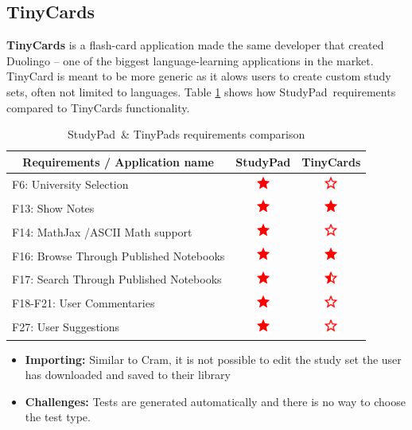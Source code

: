 \documentclass[thesis=B,english]{FITthesis}[2012/10/20]
\newcommand{\appname}{StudyPad}
\newcommand{\present}{\begin{minipage}{.1\textwidth}
\centering
      \includegraphics[width=15pt, height=15pt]{ic_star_black_24dp}
    \end{minipage}}
\newcommand{\limited}{\begin{minipage}{.1\textwidth}
\centering
      \includegraphics[width=15pt, height=15pt]{ic_star_half_black_24dp}
    \end{minipage}}
\newcommand{\absent}{\begin{minipage}{.1\textwidth}
\centering
      \includegraphics[width=15pt, height=15pt]{ic_star_border_black_24dp}
    \end{minipage}}
\begin{document}
\subsection{TinyCards}

\textbf{TinyCards} is a flash-card application made the same developer that created Duolingo --  one of the biggest language-learning applications in the market. TinyCard is meant to be more generic as it alows users to create custom study sets, often not limited to languages. Table \ref{tab:tinycards} shows how \appname\ requirements compared to TinyCards functionality.

\begin{table}[H]
\caption{\appname\ \& TinyPads requirements comparison}
\label{tab:tinycards}
\begin{tabular}{|l|c|c|}
\hline
\multicolumn{1}{|c|}{\textbf{Requirements / Application name}} & \multicolumn{1}{l|}{\textbf{StudyPad}} & \multicolumn{1}{l|}{\textbf{TinyCards}} \\ \hline
F6: University Selection                                       & \present                                & \absent                                  \\ \hline
F13: Show Notes                                                & \present                                & \present                                 \\ \hline
F14: MathJax /ASCII Math support                               & \present                                & \absent                                  \\ \hline
F16: Browse Through Published Notebooks                        & \present                                & \present                                 \\ \hline
F17: Search Through Published Notebooks                    & \present                                & \limited                                 \\ \hline
F18-F21: User Commentaries                                     & \present                                & \absent                                  \\ \hline
F27: User Suggestions                                          & \present                                & \absent                                  \\ \hline
\end{tabular}
\end{table}


	\begin{itemize}
		\item \textbf{Importing:} Similar to Cram, it is not possible to edit the study set the user has downloaded and saved to their library
		\item \textbf{Challenges:} Tests are generated automatically and there is no way to choose the test type.
	\end{itemize}
	
\end{document}
